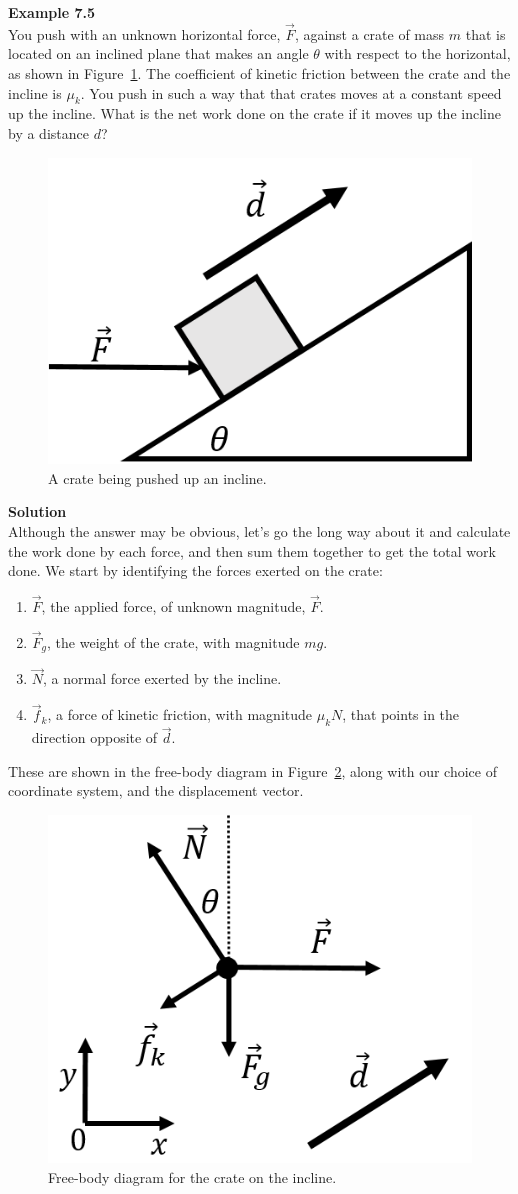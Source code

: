 \begin{framed}
\textbf{Example 7.5}\\
You push with an unknown horizontal force, $\vec F$, against a crate of mass $m$ that is located on an inclined plane that makes an angle $\theta$ with respect to the horizontal, as shown in Figure~\ref{fig:workenergy:workincline}. The coefficient of kinetic friction between the crate and the incline is $\mu_k$. You push in such a way that that crates moves at a constant speed up the incline. What is the net work done on the crate if it moves up the incline by a distance $d$?

\begin{figure}[!htbp]
\centering
\includegraphics[width=0.3\linewidth]{files/workincline-b98602f6e15a41e5f840950101a04e5d.png}
\caption[]{A crate being pushed up an incline.}
\label{fig:workenergy:workincline}
\end{figure}

\begin{framed}
\textbf{Solution}\\
Although the answer may be obvious, let's go the long way about it and calculate the work done by each force, and then sum them together to get the total work done. We start by identifying the forces exerted on the crate:

\begin{enumerate}
\item $\vec F$, the applied force, of unknown magnitude, $\vec F$.
\item $\vec F_g$, the weight of the crate, with magnitude $mg$.
\item $\vec N$, a normal force exerted by the incline.
\item $\vec f_k$, a force of kinetic friction, with magnitude $\mu_k N$, that points in the direction opposite of $\vec d$.
\end{enumerate}

These are shown in the free-body diagram in Figure~\ref{fig:workenergy:workincline_fbd}, along with our choice of coordinate system, and the displacement vector.

\begin{figure}[!htbp]
\centering
\includegraphics[width=0.3\linewidth]{files/workincline_fbd-7b9ff640523ee3e98aa1d1557bc2919d.png}
\caption[]{Free-body diagram for the crate on the incline.}
\label{fig:workenergy:workincline_fbd}
\end{figure}


\end{framed}
\end{framed}
